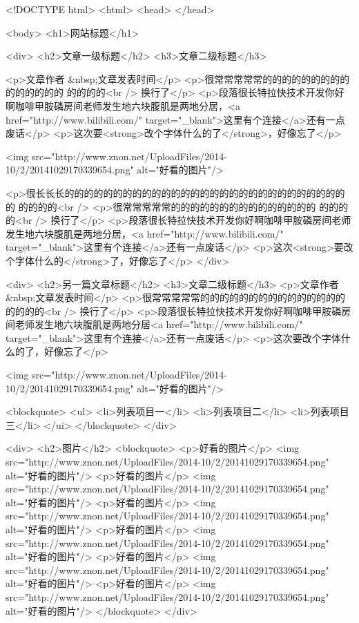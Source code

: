 ﻿<!DOCTYPE html>
<html>
<head>
</head>

<body>
<h1>网站标题</h1>

<div>
<h2>文章一级标题</h2>
<h3>文章二级标题</h3>

<p>文章作者  &nbsp;文章发表时间</p>
<p>很常常常常常的的的的的的的的的的的的的的的 的的的的<br />
   换行了</p>
<p>段落很长特拉快技术开发你好啊咖啡甲胺磷房间老师发生地六块腹肌是两地分居，<a href="http://www.bilibili.com/" target="_blank">这里有个连接</a>还有一点废话</p>
<p>这次要<strong>改个字体什么的了</strong>，好像忘了</p>

<img src="http://www.znon.net/UploadFiles/2014-10/2/20141029170339654.png"  alt="好看的图片"/>



<p>很长长长的的的的的的的的的的的的的的的的的的的的的的的的的的的的的的 的的的的<br />
<p>很常常常常常的的的的的的的的的的的的的的的 的的的的<br />
   换行了</p>
<p>段落很长特拉快技术开发你好啊咖啡甲胺磷房间老师发生地六块腹肌是两地分居，<a href="http://www.bilibili.com/" target="_blank">这里有个连接</a>还有一点废话</p>
<p>这次<strong>要改个字体什么的</strong>了，好像忘了</p>
</div>

<div>
<h2>另一篇文章标题</h2>
<h3>文章二级标题</h3>
<p>文章作者 &nbsp;文章发表时间</p>
<p>很常常常常常的的的的的的的的的的的的的的的 的的的的<br />
   换行了</p>
<p>段落很长特拉快技术开发你好啊咖啡甲胺磷房间老师发生地六块腹肌是两地分居<a href="http://www.bilibili.com/" target="_blank">这里有个连接</a>还有一点废话</p>
<p>这次要改个字体什么的了，好像忘了</p>


<img src="http://www.znon.net/UploadFiles/2014-10/2/20141029170339654.png"  alt="好看的图片"/>

<blockquote>
<ul>
<li>列表项目一</li>
<li>列表项目二</li>
<li>列表项目三</li>
</ui>
</blockquote>
</div>

<div>
<h2>图片</h2>
<blockquote>
<p>好看的图片</p>
<img src="http://www.znon.net/UploadFiles/2014-10/2/20141029170339654.png"  alt="好看的图片"/>
<p>好看的图片</p>
<img src="http://www.znon.net/UploadFiles/2014-10/2/20141029170339654.png"  alt="好看的图片"/>
<p>好看的图片</p>
<img src="http://www.znon.net/UploadFiles/2014-10/2/20141029170339654.png"  alt="好看的图片"/>
<p>好看的图片</p>
<img src="http://www.znon.net/UploadFiles/2014-10/2/20141029170339654.png"  alt="好看的图片"/>
<p>好看的图片</p>
<img src="http://www.znon.net/UploadFiles/2014-10/2/20141029170339654.png"  alt="好看的图片"/>
<p>好看的图片</p>
<img src="http://www.znon.net/UploadFiles/2014-10/2/20141029170339654.png"  alt="好看的图片"/>
</blockquote>
</div>

